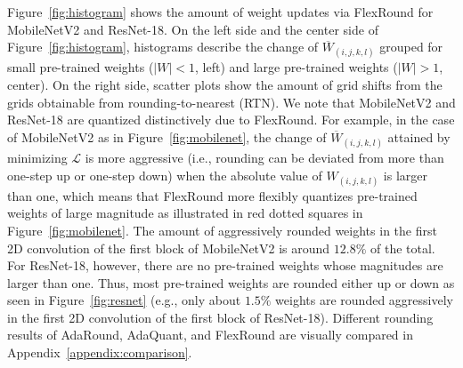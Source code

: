 \documentclass{article}
\theoremstyle{plain}
\theoremstyle{definition}
\theoremstyle{remark}
\begin{document}



Figure~\ref{fig:histogram} shows the amount of weight updates via FlexRound for MobileNetV2 and ResNet-18. 
On the left side and the center side of Figure~\ref{fig:histogram}, histograms describe the change of $\overline{W}_{(i, j, k, l)}$ grouped for small pre-trained weights ($|W| < 1$, left) and large pre-trained weights ($|W| > 1$, center). 
On the right side, scatter plots show the amount of grid shifts from the grids obtainable from rounding-to-nearest (RTN).
We note that MobileNetV2 and ResNet-18 are quantized distinctively due to FlexRound.
For example, in the case of MobileNetV2 as in Figure~\ref{fig:mobilenet}, the change of $\overline{W}_{(i, j, k, l)}$ attained by minimizing $\mathcal{L}$ is more aggressive (i.e., rounding can be deviated from more than one-step up or one-step down) when the absolute value of $W_{(i, j, k, l)}$ is larger than one, which means that FlexRound more flexibly quantizes pre-trained weights of large magnitude as illustrated in red dotted squares in Figure~\ref{fig:mobilenet}. The amount of aggressively rounded weights in the first 2D convolution of the first block of MobileNetV2 is around $12.8\%$ of the total. For ResNet-18, however, there are no pre-trained weights whose magnitudes are larger than one. Thus, most pre-trained weights are rounded either up or down as seen in Figure~\ref{fig:resnet} (e.g., only about $1.5\%$ weights are rounded aggressively in the first 2D convolution of the first block of ResNet-18). Different rounding results of AdaRound, AdaQuant, and FlexRound are visually compared in Appendix~\ref{appendix:comparison}. %
\end{document}
